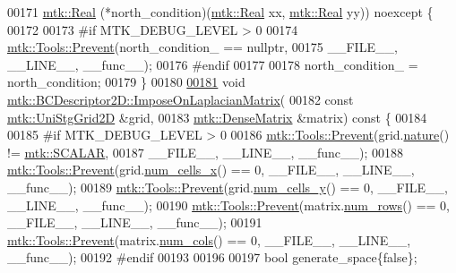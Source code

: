 \begin{DoxyCode}
00171     \hyperlink{group__c01-roots_gac080bbbf5cbb5502c9f00405f894857d}{mtk::Real} (*north\_condition)(\hyperlink{group__c01-roots_gac080bbbf5cbb5502c9f00405f894857d}{mtk::Real} xx, \hyperlink{group__c01-roots_gac080bbbf5cbb5502c9f00405f894857d}{mtk::Real} yy)) noexcept \{
00172 
00173 \textcolor{preprocessor}{  #if MTK\_DEBUG\_LEVEL > 0}
00174   \hyperlink{classmtk_1_1Tools_a332324c6f25e66be9dff48c5987a3b9f}{mtk::Tools::Prevent}(north\_condition\_ == \textcolor{keyword}{nullptr},
00175                       \_\_FILE\_\_, \_\_LINE\_\_, \_\_func\_\_);
00176 \textcolor{preprocessor}{  #endif}
00177 
00178   north\_condition\_ = north\_condition;
00179 \}
00180 
\hypertarget{mtk__bc__descriptor__2d_8cc_source_l00181}{}\hyperlink{classmtk_1_1BCDescriptor2D_abade249fa28783a5383a7c2aaf570ea9}{00181} \textcolor{keywordtype}{void} \hyperlink{classmtk_1_1BCDescriptor2D_abade249fa28783a5383a7c2aaf570ea9}{mtk::BCDescriptor2D::ImposeOnLaplacianMatrix}(
00182     \textcolor{keyword}{const} \hyperlink{classmtk_1_1UniStgGrid2D}{mtk::UniStgGrid2D} &grid,
00183     \hyperlink{classmtk_1_1DenseMatrix}{mtk::DenseMatrix} &matrix)\textcolor{keyword}{ const }\{
00184 
00185 \textcolor{preprocessor}{  #if MTK\_DEBUG\_LEVEL > 0}
00186   \hyperlink{classmtk_1_1Tools_a332324c6f25e66be9dff48c5987a3b9f}{mtk::Tools::Prevent}(grid.\hyperlink{classmtk_1_1UniStgGrid2D_a99a3a9cdb05b7306be99bde935509e30}{nature}() != \hyperlink{namespacemtk_ga4c54f2a329cfb4e56213b02a259d19e2af481d45bd70d41381c7d72e200889205}{mtk::SCALAR},
00187                       \_\_FILE\_\_, \_\_LINE\_\_, \_\_func\_\_);
00188   \hyperlink{classmtk_1_1Tools_a332324c6f25e66be9dff48c5987a3b9f}{mtk::Tools::Prevent}(grid.\hyperlink{classmtk_1_1UniStgGrid2D_a2d182866a398aba8e4829590e85bf939}{num\_cells\_x}() == 0, \_\_FILE\_\_, \_\_LINE\_\_, \_\_func\_\_);
00189   \hyperlink{classmtk_1_1Tools_a332324c6f25e66be9dff48c5987a3b9f}{mtk::Tools::Prevent}(grid.\hyperlink{classmtk_1_1UniStgGrid2D_aed05a801cc9a76dba0ff203cea58a61a}{num\_cells\_y}() == 0, \_\_FILE\_\_, \_\_LINE\_\_, \_\_func\_\_);
00190   \hyperlink{classmtk_1_1Tools_a332324c6f25e66be9dff48c5987a3b9f}{mtk::Tools::Prevent}(matrix.\hyperlink{classmtk_1_1DenseMatrix_a53f3afb3b6a8d21854458aaa9663cc74}{num\_rows}() == 0, \_\_FILE\_\_, \_\_LINE\_\_, \_\_func\_\_);
00191   \hyperlink{classmtk_1_1Tools_a332324c6f25e66be9dff48c5987a3b9f}{mtk::Tools::Prevent}(matrix.\hyperlink{classmtk_1_1DenseMatrix_a41747502d468c6728a4be31501b16e0e}{num\_cols}() == 0, \_\_FILE\_\_, \_\_LINE\_\_, \_\_func\_\_);
00192 \textcolor{preprocessor}{  #endif}
00193 
00196 
00197   \textcolor{keywordtype}{bool} generate\_space\{\textcolor{keyword}{false}\};

\end{DoxyCode}
